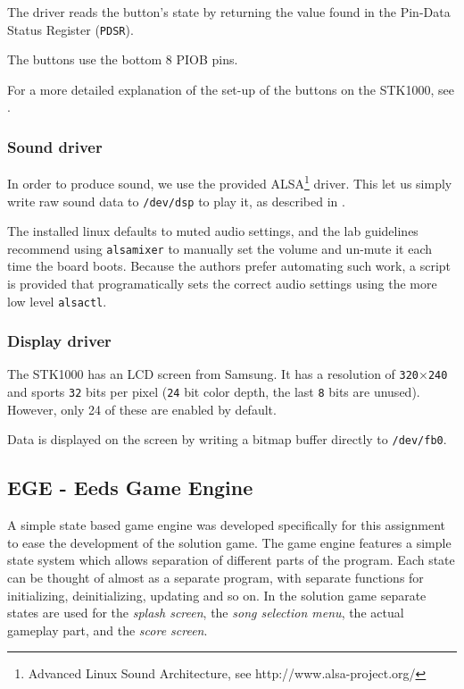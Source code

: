 The driver reads the button's state by returning the value found in the Pin-Data Status Register (\texttt{PDSR}).

The buttons use the bottom 8 PIOB pins.

For a more detailed explanation of the set-up of the buttons on the STK1000, see \cite{tdt4258-1}.

\subsubsection{Sound driver}
In order to produce sound, we use the provided ALSA\footnote{Advanced Linux Sound Architecture, see http://www.alsa-project.org/} driver.
This let us simply write raw sound data to \texttt{/dev/dsp} to play it, as described in \cite{lab-compendium}.

The installed linux defaults to muted audio settings, and the lab guidelines recommend using \texttt{alsamixer} to manually set the volume and un-mute it each time the board boots.
Because the authors prefer automating such work, a script is provided that programatically sets the correct audio settings using the more low level \texttt{alsactl}.


\subsubsection{Display driver}
The STK1000 has an LCD screen from Samsung.
It has a resolution of \texttt{320}$\times$\texttt{240} and sports \texttt{32} bits per pixel (\texttt{24} bit color depth, the last \texttt{8} bits are unused)\cite{lab-compendium}.
However, only 24 of these are enabled by default\cite{avr32-disp}.

Data is displayed on the screen by writing a bitmap buffer directly to \texttt{/dev/fb0}.


    \subsection{EGE  - Eeds Game Engine}

    A simple state based game engine was developed specifically for this assignment to ease the development of the solution game.
    The game engine features a simple state system which allows separation of different parts of the program.
    Each state can be thought of almost as a separate program, with separate functions for initializing, deinitializing, updating and so on.
    In the solution game separate states are used for the \textit{splash screen}, the \textit{song selection menu}, the actual gameplay part, and the \textit{score screen}.


